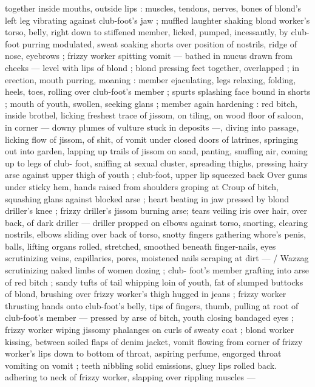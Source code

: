 together inside mouths, outside lips : muscles, tendons, nerves, 
bones of blond's left leg vibrating against club-foot's jaw ; muffled 
laughter shaking blond worker's torso, belly, right down to stiffened 
member, licked, pumped, incessantly, by club-foot purring 
modulated, sweat soaking shorts over position of nostrils, ridge of 
nose, eyebrows ; frizzy worker spitting vomit --- bathed in mucus 
drawn from cheeks --- level with lips of blond ; blond pressing feet 
together, overlapped ; in erection, mouth purring, moaning : member 
ejaculating, legs relaxing, folding, heels, toes, rolling over club-foot's 
member ; spurts splashing face bound in shorts ; mouth of youth, 
swollen, seeking glans ; member again hardening : red bitch, inside 
brothel, licking freshest trace of jissom, on tiling, on wood floor of 
saloon, in corner --- downy plumes of vulture stuck in deposits ---, 
diving into passage, licking flow of jissom, of shit, of vomit under 
closed doors of latrines, springing out into garden, lapping up trails 
of jissom on sand, panting, snuffing air, coming up to legs of club- 
foot, sniffing at sexual cluster, spreading thighs, pressing hairy arse 
against upper thigh of youth ; club-foot, upper lip squeezed back 
Over gums under sticky hem, hands raised from shoulders groping at 
Croup of bitch, squashing glans against blocked arse ; heart beating 
in jaw pressed by blond driller's knee ; frizzy driller's jissom burning 
arse; tears veiling iris over hair, over back, of dark driller --- driller 
propped on elbows against torso, snorting, clearing nostrils, elbows 
sliding over back of torso, snotty fingers gathering whore's penis, 
balls, lifting organs rolled, stretched, smoothed beneath finger-nails, 
eyes scrutinizing veins, capillaries, pores, moistened nails scraping 
at dirt --- {\slash} Wazzag scrutinizing naked limbs of women dozing ; club- 
foot's member grafting into arse of red bitch ; sandy tufts of tail 
whipping loin of youth, fat of slumped buttocks of blond, brushing 
over frizzy worker's thigh hugged in jeans ; frizzy worker thrusting 
hands onto club-foot's belly, tips of fingers, thumb, pulling at root of 
club-foot's member --- pressed by arse of bitch, youth closing 
bandaged eyes ; frizzy worker wiping jissomy phalanges on curls of 
sweaty coat ; blond worker kissing, between soiled flaps of denim 
jacket, vomit flowing from corner of frizzy worker's lips down to 
bottom of throat, aspiring perfume, engorged throat vomiting on 
vomit ; teeth nibbling solid emissions, gluey lips rolled back. 
adhering to neck of frizzy worker, slapping over rippling muscles --- 
